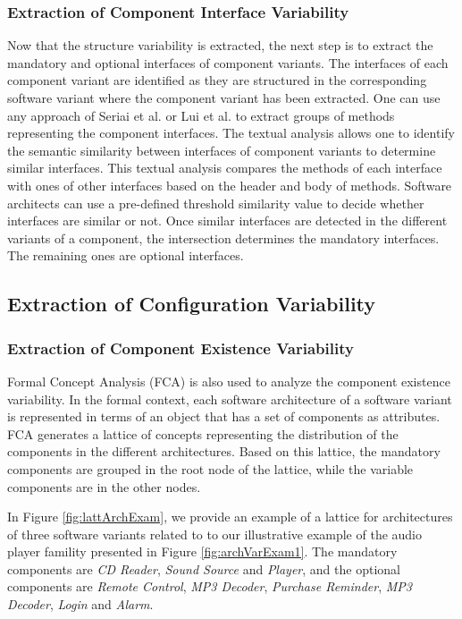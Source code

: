 \documentclass[graybox]{svmult}
\begin{document}
\subsubsection{Extraction of Component Interface Variability}
Now that the structure variability is extracted, the next step is to  extract the mandatory and optional interfaces of component variants. The interfaces of each component variant are identified as they are structured in the corresponding software variant where the component variant has been extracted. One can use any approach of Seriai et al. \cite{seriai2014deriving} or Lui et al. \cite{liu2018component} to extract groups of methods representing the component interfaces. 
The textual analysis allows one to identify the semantic similarity between interfaces of component variants to determine similar interfaces. This textual analysis compares the methods of each interface with ones of other interfaces based on the header and body of methods. Software architects can use a pre-defined threshold similarity value to decide whether interfaces are similar or not. Once similar interfaces are detected in the different variants of a component, the intersection determines the mandatory interfaces. The remaining ones are optional interfaces.  


\subsection{Extraction of Configuration Variability}

\subsubsection{Extraction of Component Existence Variability}

Formal Concept Analysis (FCA) is also used to analyze the component existence variability. In the formal context, each software architecture of a software variant is represented in terms of an object that has a set of components as attributes. FCA generates a lattice of concepts representing the distribution of the components in the different architectures. Based on this lattice, the mandatory components are grouped in the root node of the lattice, while the variable components are in the other nodes.

In Figure \ref{fig:lattArchExam}, we provide an example of a lattice for architectures of three software variants related to to our illustrative example of the audio player famility presented in Figure \ref{fig:archVarExam1}. The mandatory components are \textit{CD Reader}, \textit{Sound Source} and \textit{Player}, and the optional components are \textit{Remote Control}, \textit{MP3 Decoder}, \textit{Purchase Reminder}, \textit{MP3 Decoder}, \textit{Login} and \textit{Alarm}.
\end{document}
